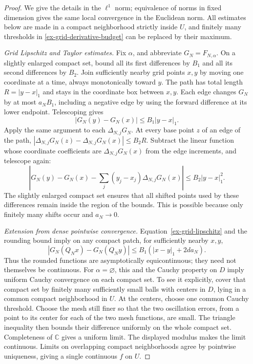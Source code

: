\begin{proof}
We give the details in the \(\ell^1\) norm; equivalence of norms in
fixed dimension gives the same local convergence in the Euclidean norm.
All estimates below are made in a compact neighborhood strictly inside
\(U\), and finitely many thresholds in
\eqref{ex-grid-derivative-budget} can be replaced by their maximum.

\emph{Grid Lipschitz and Taylor estimates.}
Fix \(\alpha\), and abbreviate \(G_N=F_{N,\alpha}\).
On a slightly enlarged compact set, bound all its first differences
by \(B_1\) and all its second differences by \(B_2\). Join sufficiently
nearby grid points \(x,y\) by moving one coordinate at a time, always
monotonically toward \(y\). The path has total length
\(R=|y-x|_1\) and stays in the coordinate box between \(x,y\).
Each edge changes \(G_N\) by at most \(a_NB_1\), including a
negative edge by using the forward difference at its lower endpoint.
Telescoping gives
\begin{equation}\label{ex-grid-lipschitz}
 |G_N(y)-G_N(x)|\le B_1|y-x|_1.
\end{equation}
Apply the same argument to each \(\Delta_{N,j}G_N\). At every base
point \(z\) of an edge of the path,
\(|\Delta_{N,j}G_N(z)-\Delta_{N,j}G_N(x)|\le B_2R\).
Subtract the linear function whose coordinate coefficients are
\(\Delta_{N,j}G_N(x)\) from the edge increments, and telescope again:
\begin{equation}\label{ex-grid-taylor}
 \left|G_N(y)-G_N(x)-\sum_j(y_j-x_j)\Delta_{N,j}G_N(x)\right|
 \le B_2|y-x|_1^2.
\end{equation}
The slightly enlarged compact set ensures that all shifted points used
by these differences remain inside the region of the bounds. This is
possible because only finitely many shifts occur and \(a_N\to0\).

\emph{Extension from dense pointwise convergence.}
Equation~\eqref{ex-grid-lipschitz} and the rounding bound imply on any
compact patch, for sufficiently nearby \(x,y\),
\[
 |G_N(Q_Nx)-G_N(Q_Ny)|\le B_1(|x-y|_1+2da_N).
\]
Thus the rounded functions are asymptotically equicontinuous; they need
not themselves be continuous. For \(\alpha=\varnothing\), this and
the Cauchy property on \(D\) imply uniform Cauchy convergence on each
compact set. To see it explicitly, cover that compact set by finitely
many sufficiently small balls with centers in \(D\), lying in a common
compact neighborhood in \(U\). At the centers, choose one common
Cauchy threshold. Choose the mesh still finer so that the two oscillation
errors, from a point to its center for each of the two mesh functions,
are small. The triangle inequality then bounds their difference uniformly
on the whole compact set. Completeness of \(\mathbb C\) gives a
uniform limit. The displayed modulus makes the limit continuous. Limits
on overlapping compact neighborhoods agree by pointwise uniqueness,
giving a single continuous \(f\) on \(U\).


\end{proof}
